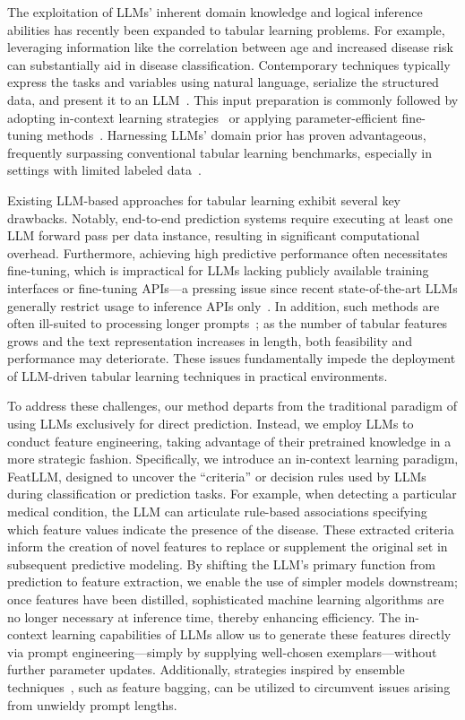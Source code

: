 The exploitation of LLMs’ inherent domain knowledge and logical inference abilities has recently been expanded to tabular learning problems. For example, leveraging information like the correlation between age and increased disease risk can substantially aid in disease classification. Contemporary techniques typically express the tasks and variables using natural language, serialize the structured data, and present it to an LLM~\cite{dinh2022lift,wang2023anypredict}. This input preparation is commonly followed by adopting in-context learning strategies~\cite{nam2023semi} or applying parameter-efficient fine-tuning methods~\cite{dinh2022lift,hegselmann2023tabllm}. Harnessing LLMs’ domain prior has proven advantageous, frequently surpassing conventional tabular learning benchmarks, especially in settings with limited labeled data~\cite{hegselmann2023tabllm}.

Existing LLM-based approaches for tabular learning exhibit several key drawbacks. Notably, end-to-end prediction systems require executing at least one LLM forward pass per data instance, resulting in significant computational overhead. Furthermore, achieving high predictive performance often necessitates fine-tuning, which is impractical for LLMs lacking publicly available training interfaces or fine-tuning APIs—a pressing issue since recent state-of-the-art LLMs generally restrict usage to inference APIs only~\cite{anil2023palm,openai2023gpt4}. In addition, such methods are often ill-suited to processing longer prompts~\cite{liu2023lost}; as the number of tabular features grows and the text representation increases in length, both feasibility and performance may deteriorate. These issues fundamentally impede the deployment of LLM-driven tabular learning techniques in practical environments.

To address these challenges, our method departs from the traditional paradigm of using LLMs exclusively for direct prediction. Instead, we employ LLMs to conduct feature engineering, taking advantage of their pretrained knowledge in a more strategic fashion. Specifically, we introduce an in-context learning paradigm, \textsf{FeatLLM}, designed to uncover the “criteria” or decision rules used by LLMs during classification or prediction tasks. For example, when detecting a particular medical condition, the LLM can articulate rule-based associations specifying which feature values indicate the presence of the disease. These extracted criteria inform the creation of novel features to replace or supplement the original set in subsequent predictive modeling. By shifting the LLM’s primary function from prediction to feature extraction, we enable the use of simpler models downstream; once features have been distilled, sophisticated machine learning algorithms are no longer necessary at inference time, thereby enhancing efficiency. The in-context learning capabilities of LLMs allow us to generate these features directly via prompt engineering—simply by supplying well-chosen exemplars—without further parameter updates. Additionally, strategies inspired by ensemble techniques~\cite{breiman2001random}, such as feature bagging, can be utilized to circumvent issues arising from unwieldy prompt lengths.

